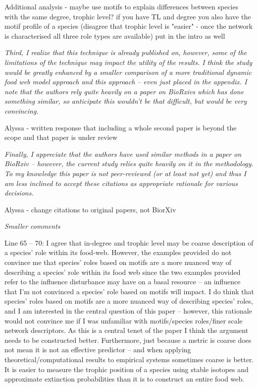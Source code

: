 \documentclass[12pt]{article}
\newcommand{\us}{\rm \setlength{\leftskip}{0.3cm} \setlength{\rightskip}{0.3cm}}
\newcommand{\them}{\it \setlength{\leftskip}{0cm} \setlength{\rightskip}{0cm}}
\begin{document}
\us
Additional analysis - maybe use motifs to explain differences between species with the same degree, trophic level?
if you have TL and degree you also have the motif profile of a species (disagree that trophic level is "easier" - once the network is characterised all three role types are available) put in the intro as well

\them
Third, I realize that this technique is already published on, however, some of the limitations of the technique may impact the utility of the results. I think the study would be greatly enhanced by a smaller comparison of a more traditional dynamic food web model approach and this approach – even just placed in the appendix. I note that the authors rely quite heavily on a paper on BioRxivs which has done something similar, so anticipate this wouldn’t be that difficult, but would be very convincing.

\us Alyssa - written response that including a whole second paper is beyond the scope and that paper is under review

\them
Finally, I appreciate that the authors have used similar methods in a paper on BioRxiv – however, the current study relies quite heavily on it in the methodology. To my knowledge this paper is not peer-reviewed (or at least not yet) and thus I am less inclined to accept these citations as appropriate rationale for various decisions.

\us Alyssa - change citations to original papers, not BiorXiv 

\them
Smaller comments

Line 65 – 70: I agree that in-degree and trophic level may be coarse description of a species’ role within its food-web. However, the examples provided do not convince me that species’ roles based on motifs are a more nuanced way of describing a species’ role within its food web since the two examples provided refer to the influence disturbance may have on a basal resource – an influence that I’m not convinced a species’ role based on motifs will impact.  
I do think that species’ roles based on motifs are a more nuanced way of describing species’ roles, and I am interested in the central question of this paper – however, this rationale would not convince me if I was unfamiliar with motifs/species roles/finer scale network descriptors.  As this is a central tenet of the paper I think the argument needs to be constructed better. Furthermore, just because a metric is coarse does not mean it is not an effective predictor – and when applying theoretical/computational results to empirical systems sometimes coarse is better. It is easier to measure the trophic position of a species using stable isotopes and approximate extinction probabilities than it is to construct an entire food web.
\end{document}
